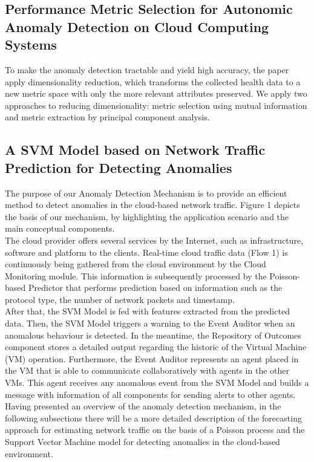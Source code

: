 \documentclass[a4paper, 12pt]{article}
\begin{document}
\subsection{Performance Metric Selection for Autonomic
Anomaly Detection on Cloud Computing Systems}
\hspace{1cm} 
To make the anomaly detection tractable and yield high
accuracy, the paper apply dimensionality reduction, which transforms
the collected health data to a new metric space with only
the more relevant attributes preserved. We apply two
approaches to reducing dimensionality: metric selection using
mutual information and metric extraction by principal component
analysis.\\


\subsection{A SVM Model based on Network Traffic Prediction for Detecting Anomalies}
\hspace{1cm} The purpose of our Anomaly Detection Mechanism is to provide an efficient
method to detect anomalies in the cloud-based network traffic. Figure
1 depicts the basis of our mechanism, by highlighting the application
scenario and the main conceptual components.\\
The cloud provider offers several services by the Internet, such as infrastructure,
software and platform to the clients. Real-time cloud traffic
data (Flow 1) is continuously being gathered from the cloud environment
by the Cloud Monitoring module. This information is subsequently processed
by the Poisson-based Predictor that performs prediction based on
information such as the protocol type, the number of network packets and
timestamp.\\
After that, the SVM Model is fed with features extracted from the
predicted data. Then, the SVM Model triggers a warning to the
Event Auditor when an anomalous behaviour is detected. In
the meantime, the Repository of Outcomes component stores a detailed
output regarding the historic of the Virtual Machine (VM) operation. Furthermore, the Event Auditor represents an agent placed in the VM
that is able to communicate collaboratively with agents in the other VMs.
This agent receives any anomalous event from the SVM Model and builds
a message with information of all components for sending alerts
to other agents.
Having presented an overview of the anomaly detection mechanism,
in the following subsections there will be a more detailed description of
the forecasting approach for estimating network traffic on the basis of
a Poisson process and the Support Vector Machine model for detecting
anomalies in the cloud-based environment.
\end{document}

